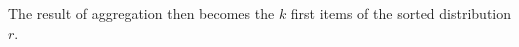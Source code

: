 The result of \MC aggregation then becomes the $k$ first items of the sorted distribution $r$.
%
%
%
%
%
%
%
%
%
%
